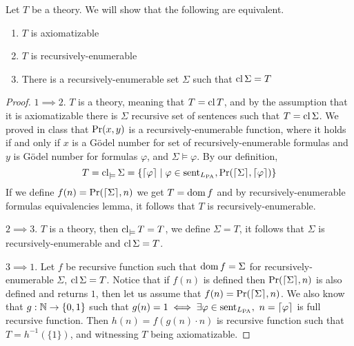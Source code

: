 \question{}
Let $T$ be a theory.
We will show that the following are equivalent.
\begin{enumerate}
	\item $T$ is axiomatizable
	\item $T$ is recursively-enumerable
	\item There is a recursively-enumerable set $\Sigma$ such that $\operatorname{cl} \Sigma = T$
\end{enumerate}
\begin{proof}
	$1 \implies 2$.
	$T$ is a theory, meaning that $T = \operatorname{cl} T$, and by the assumption that it is axiomatizable there is $\Sigma$ recursive set of sentences such that $T = \operatorname{cl} \Sigma$.
	We proved in class that $\operatorname{Pr}(x, y)$ is a recursively-enumerable function,
	where it holds if and only if $x$ is a Gödel number for set of recursively-enumerable formulas and $y$ is Gödel number for formulas $\varphi$, and $\Sigma \models \varphi$.
	By our definition,
	\[
		T = \operatorname{cl}_{\models} \Sigma = \{ \lceil \varphi \rceil \mid \varphi \in \operatorname{sent}_{L_{\operatorname{PA}}}, \operatorname{Pr}(\lceil \Sigma \rceil, \lceil \varphi \rceil) \}
	\]
	If we define $f(n) = \operatorname{Pr}(\lceil \Sigma \rceil, n)$ we get $T = \operatorname{dom} f$ and by recursively-enumerable formulas equivalencies lemma, it follows that $T$ is recursively-enumerable.

	$2 \implies 3$.
	$T$ is a theory, then $\operatorname{cl}_{\models} T = T$, we define $\Sigma = T$, it follows that $\Sigma$ is recursively-enumerable and $\operatorname{cl} \Sigma = T$.

	$3 \implies 1$.
	Let $f$ be recursive function such that $\operatorname{dom} f = \Sigma$ for recursively-enumerable $\Sigma$, $\operatorname{cl} \Sigma = T$.
	Notice that if $f(n)$ is defined then $\operatorname{Pr}(\lceil \Sigma \rceil, n)$ is also defined and returns $1$, then let us assume that $f(n) = \operatorname{Pr}(\lceil \Sigma \rceil, n)$.
	We also know that $g : \mathbb{N} \to \{ 0, 1 \}$ such that $g(n) = 1 \iff \exists \varphi \in \sent_{L_{\PA}},\ n = \lceil \varphi \rceil$ is full recursive function.
	Then $h(n) = f(g(n) \cdot n)$ is recursive function such that $T = h^{-1}(\{ 1 \})$, and witnessing $T$ being axiomatizable.
\end{proof}

